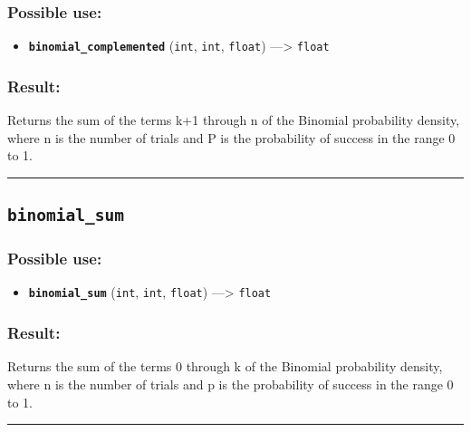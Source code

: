 \documentclass[]{book}
\providecommand{\tightlist}{%
  \setlength{\itemsep}{0pt}\setlength{\parskip}{0pt}}
\theoremstyle{definition}
\theoremstyle{definition}
\theoremstyle{definition}
\theoremstyle{remark}
\begin{document}
\subsubsection{Possible use:}\label{possible-use-72}

\begin{itemize}
\tightlist
\item
  \textbf{\texttt{binomial\_complemented}} (\texttt{int}, \texttt{int},
  \texttt{float}) ---\textgreater{} \texttt{float}
\end{itemize}

\subsubsection{Result:}\label{result-71}

Returns the sum of the terms k+1 through n of the Binomial probability
density, where n is the number of trials and P is the probability of
success in the range 0 to 1.

\begin{center}\rule{0.5\linewidth}{\linethickness}\end{center}

\subsection{\texorpdfstring{\texttt{binomial\_sum}}{binomial\_sum}}\label{binomial_sum}

\subsubsection{Possible use:}\label{possible-use-73}

\begin{itemize}
\tightlist
\item
  \textbf{\texttt{binomial\_sum}} (\texttt{int}, \texttt{int},
  \texttt{float}) ---\textgreater{} \texttt{float}
\end{itemize}

\subsubsection{Result:}\label{result-72}

Returns the sum of the terms 0 through k of the Binomial probability
density, where n is the number of trials and p is the probability of
success in the range 0 to 1.

\begin{center}\rule{0.5\linewidth}{\linethickness}\end{center}
\end{document}
